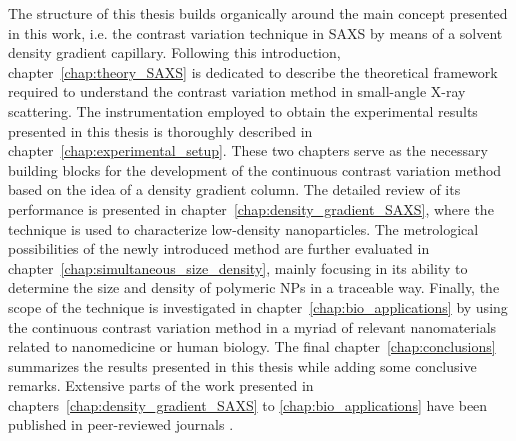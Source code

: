 The structure of this thesis builds organically around the main concept presented in this work, i.e. the contrast variation technique in SAXS by means of a solvent density gradient capillary. Following this introduction, chapter~\ref{chap:theory_SAXS} is dedicated to describe the theoretical framework required to understand the contrast variation method in small-angle X-ray scattering. The instrumentation employed to obtain the experimental results presented in this thesis is thoroughly described in chapter~\ref{chap:experimental_setup}. These two chapters serve as the necessary building blocks for the development of the continuous contrast variation method based on the idea of a density gradient column. The detailed review of its performance is presented in chapter~\ref{chap:density_gradient_SAXS}, where the technique is used to characterize low-density nanoparticles. The metrological possibilities of the newly introduced method are further evaluated in chapter~\ref{chap:simultaneous_size_density}, mainly focusing in its ability to determine the size and density of polymeric NPs in a traceable way. Finally, the scope of the technique is investigated in chapter~\ref{chap:bio_applications} by using the continuous contrast variation method in a myriad of relevant nanomaterials related to nanomedicine or human biology. The final chapter~\ref{chap:conclusions} summarizes the results presented in this thesis while adding some conclusive remarks. Extensive parts of the work presented in chapters~\ref{chap:density_gradient_SAXS} to \ref{chap:bio_applications} have been published in peer-reviewed journals \citep{minelli_characterization_2014,garcia-diez_nanoparticle_2015,garcia-diez_size_2016,garcia-diez_simultaneous_2016-1}.








